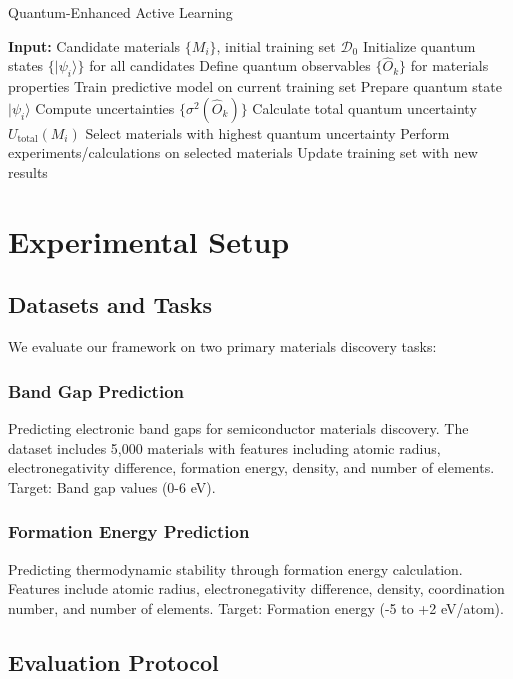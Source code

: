 \documentclass[twocolumn]{article}
\begin{document}
\begin{algorithm}
\caption{Quantum-Enhanced Active Learning}
\begin{algorithmic}[1]
\STATE \textbf{Input:} Candidate materials $\{M_i\}$, initial training set $\mathcal{D}_0$
\STATE Initialize quantum states $\{|\psi_i\rangle\}$ for all candidates
\STATE Define quantum observables $\{\hat{O}_k\}$ for materials properties
\REPEAT
\STATE Train predictive model on current training set
\STATE Prepare quantum state $|\psi_i\rangle$
\STATE Compute uncertainties $\{\sigma^2(\hat{O}_k)\}$
\STATE Calculate total quantum uncertainty $U_{\text{total}}(M_i)$
\ENDFOR
\STATE Select materials with highest quantum uncertainty
\STATE Perform experiments/calculations on selected materials
\STATE Update training set with new results
\end{algorithmic}
\end{algorithm}

\section{Experimental Setup}

\subsection{Datasets and Tasks}

We evaluate our framework on two primary materials discovery tasks:

\subsubsection{Band Gap Prediction}
Predicting electronic band gaps for semiconductor materials discovery. The dataset includes 5,000 materials with features including atomic radius, electronegativity difference, formation energy, density, and number of elements. Target: Band gap values (0-6 eV).

\subsubsection{Formation Energy Prediction}
Predicting thermodynamic stability through formation energy calculation. Features include atomic radius, electronegativity difference, density, coordination number, and number of elements. Target: Formation energy (-5 to +2 eV/atom).

\subsection{Evaluation Protocol}
\end{document}
